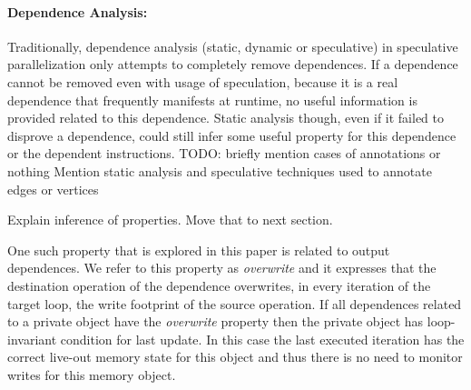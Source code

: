 \paragraph{Dependence Analysis:}

%
Traditionally, dependence analysis (static, dynamic or speculative) in
speculative parallelization only attempts to completely remove dependences.
%
If a dependence cannot be removed even with usage of speculation, because
it is a real dependence that frequently manifests at runtime, no useful
information is provided related to this dependence.
%
Static analysis though, even if it failed to disprove a dependence, could
still infer some useful property for this dependence or the dependent
instructions.
TODO: briefly mention cases of annotations or nothing
Mention static analysis and speculative techniques used to annotate edges
or vertices

%



Explain inference of properties. Move that to next section.

One such property
that is explored in this paper is related to output dependences.  We refer
to this property as \textit{overwrite} and it expresses that the
destination operation of the dependence overwrites, in every iteration of
the target loop, the write footprint of the source operation.
%
If all dependences related to a private object have the \textit{overwrite}
property then the private object has loop-invariant condition for last
update. In this case the last executed iteration has the correct live-out
memory state for this object and thus there is no need to monitor writes
for this memory object.

